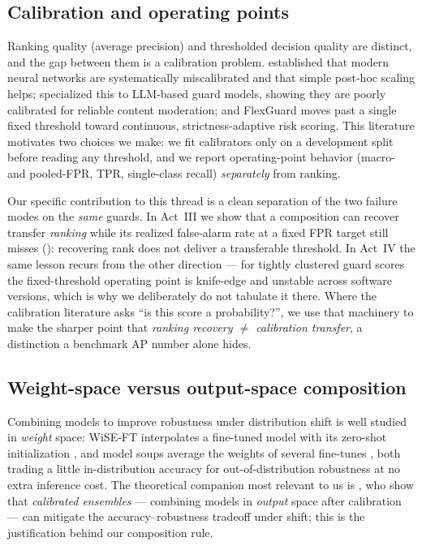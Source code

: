 \subsection{Calibration and operating points}
\label{sec:related-calibration}
Ranking quality (average precision) and thresholded decision quality are distinct, and the gap between
them is a calibration problem. \citet{guo2017calibration} established that modern neural networks are
systematically miscalibrated and that simple post-hoc scaling helps; \citet{liu2025calibration}
specialized this to LLM-based guard models, showing they are poorly calibrated for reliable content
moderation; and FlexGuard \citep{flexguard2026} moves past a single fixed threshold toward continuous,
strictness-adaptive risk scoring. This literature motivates two choices we make: we fit calibrators only
on a development split before reading any threshold, and we report operating-point behavior (macro- and
pooled-FPR, TPR, single-class recall) \emph{separately} from ranking.

Our specific contribution to this thread is a clean separation of the two failure modes on the \emph{same}
guards. In Act~III we show that a composition can recover transfer \emph{ranking} while its realized
false-alarm rate at a fixed FPR target still misses (): recovering rank does
not deliver a transferable threshold. In Act~IV the same lesson recurs from the other direction --- for
tightly clustered guard scores the fixed-threshold operating point is knife-edge and unstable across
software versions, which is why we deliberately do not tabulate it there. Where the calibration
literature asks ``is this score a probability?'', we use that machinery to make the sharper point that
\emph{ranking recovery $\neq$ calibration transfer}, a distinction a benchmark AP number alone hides.

\subsection{Weight-space versus output-space composition}
\label{sec:related-composition}
Combining models to improve robustness under distribution shift is well studied in \emph{weight} space:
WiSE-FT interpolates a fine-tuned model with its zero-shot initialization \citep{wortsman2022wiseft},
and model soups average the weights of several fine-tunes \citep{wortsman2022modelsoups}, both trading a
little in-distribution accuracy for out-of-distribution robustness at no extra inference cost. The
theoretical companion most relevant to us is \citet{kumar2022calibrated}, who show that \emph{calibrated
ensembles} --- combining models in \emph{output} space after calibration --- can mitigate the
accuracy--robustness tradeoff under shift; this is the justification behind our composition rule.

